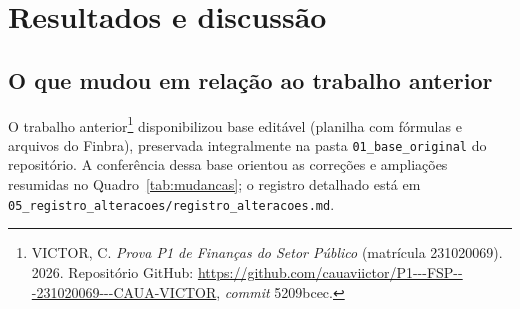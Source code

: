 \section{Resultados e discussão}\label{sec:resultados}

\subsection{O que mudou em relação ao trabalho anterior}

O trabalho anterior\footnote{VICTOR, C. \textit{Prova P1 de Finanças do Setor Público} (matrícula 231020069). 2026. Repositório GitHub: \url{https://github.com/cauaviictor/P1---FSP---231020069---CAUA-VICTOR}, \textit{commit} 5209bcec.} disponibilizou base editável (planilha com fórmulas e arquivos do Finbra), preservada integralmente na pasta \texttt{01\_base\_original} do repositório. A conferência dessa base orientou as correções e ampliações resumidas no Quadro~\ref{tab:mudancas}; o registro detalhado está em \texttt{05\_registro\_alteracoes/registro\_alteracoes.md}.

